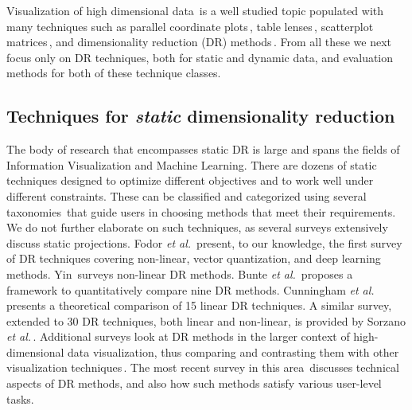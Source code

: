 
Visualization of high dimensional data\,\cite{Liu2017} is a well studied topic populated with many techniques such as parallel coordinate plots\,\cite{Inselberg}, table lenses\,\cite{Rao2003}, scatterplot matrices\,\cite{Becker1996}, and dimensionality reduction (DR) methods\,\cite{nonato_survey,vandermaaten2009dimensionality,EspadotoSurvey}. From all these we next focus only on DR techniques, both for static and dynamic data, and evaluation methods for both of these technique classes.

\subsection{Techniques for \textit{static} dimensionality reduction}
%
The body of research that encompasses static DR is large and spans the fields of Information Visualization and Machine Learning. There are dozens of static techniques designed to optimize different objectives and to work well under different constraints. These can be classified and categorized using several taxonomies\,\cite{vandermaaten2009dimensionality} that guide users in choosing methods that meet their requirements. We do not further elaborate on such techniques, as several surveys extensively discuss static projections. Fodor \emph{et al.}\,\cite{fodor02_survey} present, to our knowledge, the first survey of DR techniques covering non-linear, vector quantization, and deep learning methods. Yin\,\cite{yin07_survey} surveys non-linear DR methods. Bunte \emph{et al.}\,\cite{bunte11} proposes a framework to quantitatively compare nine DR methods. Cunningham \emph{et al.}\,\cite{cunningham15_survey} presents a theoretical comparison of 15 linear DR techniques. A similar survey, extended to 30 DR techniques, both linear and non-linear, is provided by Sorzano \emph{et al.}\,\cite{sorzano14_survey}. Additional surveys look at DR methods in the larger context of high-dimensional data visualization, thus comparing and contrasting them with other visualization techniques\,\cite{buja96,hoffman02,engel12,kehrer13}. The most recent survey in this area\,\cite{nonato_survey} discusses technical aspects of DR methods, and also how such methods satisfy various user-level tasks.

